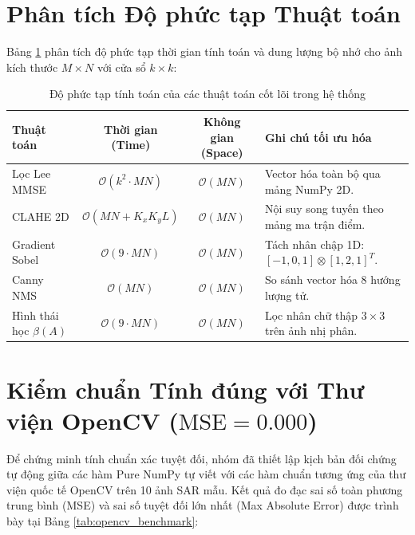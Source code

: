 \section{Phân tích Độ phức tạp Thuật toán}
Bảng \ref{tab:complexity} phân tích độ phức tạp thời gian tính toán và dung lượng bộ nhớ cho ảnh kích thước $M \times N$ với cửa sổ $k \times k$:

\begin{table}[H]
\centering
\small
\begin{tabularx}{\textwidth}{|l|c|c|X|}
\hline
\textbf{Thuật toán} & \textbf{Thời gian (Time)} & \textbf{Không gian (Space)} & \textbf{Ghi chú tối ưu hóa} \\
\hline
Lọc Lee MMSE & $\mathcal{O}(k^2 \cdot MN)$ & $\mathcal{O}(MN)$ & Vector hóa toàn bộ qua mảng NumPy 2D. \\
CLAHE 2D & $\mathcal{O}(MN + K_x K_y L)$ & $\mathcal{O}(MN)$ & Nội suy song tuyến theo mảng ma trận điểm. \\
Gradient Sobel & $\mathcal{O}(9 \cdot MN)$ & $\mathcal{O}(MN)$ & Tách nhân chập 1D: $[-1, 0, 1] \otimes [1, 2, 1]^T$. \\
Canny NMS & $\mathcal{O}(MN)$ & $\mathcal{O}(MN)$ & So sánh vector hóa 8 hướng lượng tử. \\
Hình thái học $\beta(A)$ & $\mathcal{O}(9 \cdot MN)$ & $\mathcal{O}(MN)$ & Lọc nhân chữ thập $3 \times 3$ trên ảnh nhị phân. \\
\hline
\end{tabularx}
\caption{Độ phức tạp tính toán của các thuật toán cốt lõi trong hệ thống}
\label{tab:complexity}
\end{table}



\section{Kiểm chuẩn Tính đúng với Thư viện OpenCV ($\text{MSE} = 0.000$)}
\label{sec:opencv_verification}
Để chứng minh tính chuẩn xác tuyệt đối, nhóm đã thiết lập kịch bản đối chứng tự động giữa các hàm Pure NumPy tự viết với các hàm chuẩn tương ứng của thư viện quốc tế OpenCV trên 10 ảnh SAR mẫu. Kết quả đo đạc sai số toàn phương trung bình (MSE) và sai số tuyệt đối lớn nhất (Max Absolute Error) được trình bày tại Bảng \ref{tab:opencv_benchmark}:

